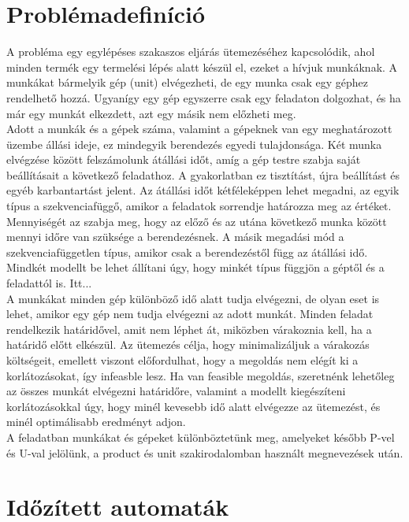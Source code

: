 \documentclass {report}
\begin{document}
\chapter{Problémadefiníció}
A probléma egy egylépéses szakaszos eljárás ütemezéséhez kapcsolódik, ahol minden termék egy termelési lépés alatt készül el, ezeket a hívjuk munkáknak. A munkákat bármelyik gép (unit) elvégezheti, de egy munka csak egy géphez rendelhető hozzá. Ugyanígy egy gép egyszerre csak egy feladaton dolgozhat, és ha már egy munkát elkezdett, azt egy másik nem előzheti meg. \\
Adott a munkák és a gépek száma, valamint a gépeknek van egy meghatározott üzembe állási ideje, ez mindegyik berendezés egyedi tulajdonsága. Két munka elvégzése között felszámolunk átállási időt, amíg a gép testre szabja saját beállításait a következő feladathoz. A gyakorlatban ez tisztítást, újra beállítást és egyéb karbantartást jelent. Az átállási időt kétféleképpen lehet megadni, az egyik típus a szekvenciafüggő, amikor a feladatok sorrendje határozza meg az értéket. Mennyiségét az szabja meg, hogy az előző és az utána következő munka között mennyi időre van szüksége a berendezésnek. A másik megadási mód a szekvenciafüggetlen típus, amikor csak a berendezéstől függ az átállási idő. Mindkét modellt be lehet állítani úgy, hogy minkét típus függjön a géptől és a feladattól is. Itt... \\
A munkákat minden gép különböző idő alatt tudja elvégezni, de olyan eset is lehet, amikor egy gép nem tudja elvégezni az adott munkát. Minden feladat rendelkezik határidővel, amit nem léphet át, miközben várakoznia kell, ha a határidő előtt elkészül. Az ütemezés célja, hogy minimalizáljuk a várakozás költségeit, emellett viszont előfordulhat, hogy a megoldás nem elégít ki a korlátozásokat, így infeasble lesz. Ha van feasible megoldás, szeretnénk lehetőleg az összes munkát elvégezni határidőre, valamint a modellt kiegészíteni korlátozásokkal úgy, hogy minél kevesebb idő alatt elvégezze az ütemezést, és minél optimálisabb eredményt adjon.  \\
A feladatban munkákat és gépeket különböztetünk meg, amelyeket később P-vel és U-val jelölünk, a product és unit szakirodalomban használt megnevezések után.

\chapter{Időzített automaták}
\end{document}
